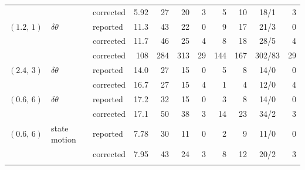 \documentclass[10pt]{article}
\begin{document}
\begin{table}[H]
\begin{tabular}{lllrrrrrrcr}
 &  & corrected & 5.92 & 27 & 20 & 3 & 5 & 10 & 18/1 & 3 \\
\addlinespace[2pt]
$(1.2,\,1)$ & $\delta\theta$ & reported & 11.3 & 43 & 22 & 0 & 9 & 17 & 21/3 & 0 \\
 &  & corrected & 11.7 & 46 & 25 & 4 & 8 & 18 & 28/5 & 4 \\
\addlinespace[2pt]
 &  & corrected & 108 & 284 & 313 & 29 & 144 & 167 & 302/83 & 29 \\
\addlinespace[2pt]
$(2.4,\,3)$ & $\delta\theta$ & reported & 14.0 & 27 & 15 & 0 & 5 & 8 & 14/0 & 0 \\
 &  & corrected & 16.7 & 27 & 15 & 4 & 1 & 4 & 12/0 & 4 \\
\addlinespace[2pt]
$(0.6,\,6)$ & $\delta\theta$ & reported & 17.2 & 32 & 15 & 0 & 3 & 8 & 14/0 & 0 \\
 &  & corrected & 17.1 & 50 & 38 & 3 & 14 & 23 & 34/2 & 3 \\
\addlinespace[2pt]
$(0.6,\,6)$ & state motion & reported & 7.78 & 30 & 11 & 0 & 2 & 9 & 11/0 & 0 \\
 &  & corrected & 7.95 & 43 & 24 & 3 & 8 & 12 & 20/2 & 3 \\
\addlinespace[2pt]
\bottomrule\end{tabular}\end{table}
\clearpage
\end{document}
